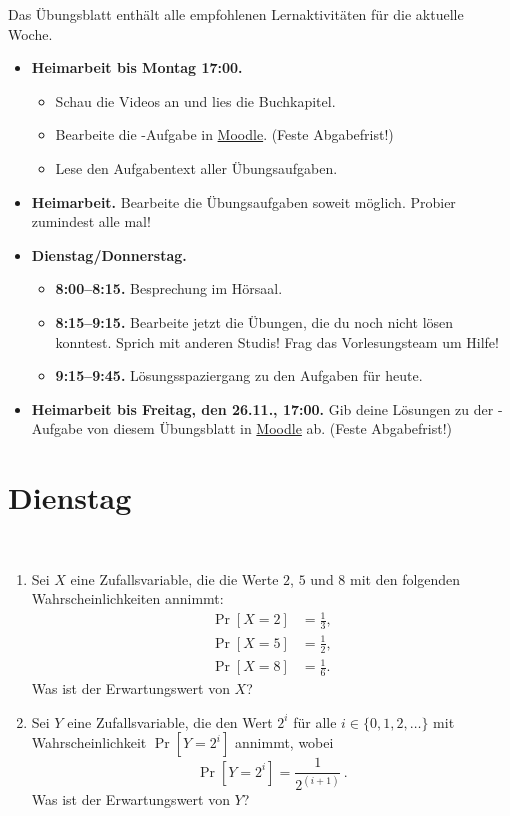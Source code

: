 \documentclass{uebung_cs}
\begin{document}
Das Übungsblatt enthält alle empfohlenen Lernaktivitäten für die aktuelle Woche.

\begin{itemize}
\item \textbf{Heimarbeit bis Montag 17:00.}
    \begin{itemize}
    \item 
    Schau die Videos an und lies die Buchkapitel.
    \item Bearbeite die -Aufgabe in \href{https://moodle.studiumdigitale.uni-frankfurt.de/moodle/course/view.php?id=2241}{Moodle}. (Feste Abgabefrist!)
    \item Lese den Aufgabentext aller Übungsaufgaben.
    \end{itemize}
\item \textbf{Heimarbeit.} Bearbeite die Übungsaufgaben soweit möglich. Probier zumindest alle mal!
\item \textbf{Dienstag/Donnerstag.}
\begin{itemize}
    \item \textbf{8:00--8:15.} Besprechung im Hörsaal.
    \item \textbf{8:15--9:15.} Bearbeite jetzt die Übungen, die du noch nicht lösen konntest. Sprich mit anderen Studis! Frag das Vorlesungsteam um Hilfe!
    \item \textbf{9:15--9:45.} Lösungsspaziergang zu den Aufgaben für heute.
\end{itemize}

\item \textbf{Heimarbeit bis Freitag, den 26.11., 17:00.} Gib deine Lösungen zu der -Aufgabe von diesem Übungsblatt in \href{https://moodle.studiumdigitale.uni-frankfurt.de/moodle/course/view.php?id=2241}{Moodle} ab. (Feste Abgabefrist!)
\end{itemize}

\section*{Dienstag}

\begin{aufgabe}[Erwartungswerte]\
	\begin{enumerate}
		\item Sei $X$ eine Zufallsvariable, die die Werte $2$, $5$ und $8$ mit den folgenden Wahrscheinlichkeiten annimmt:
		\begin{align*}
			\Pr[X=2] &= \tfrac{1}{3},\\
			\Pr[X=5] &= \tfrac{1}{2},\\
			\Pr[X=8] &= \tfrac{1}{6}.
		\end{align*}
		Was ist der Erwartungswert von $X$?\\
		
		\item Sei $Y$ eine Zufallsvariable, die den Wert $2^i$ für alle $i \in \{0,1,2,\dots\}$ mit Wahrscheinlichkeit $\Pr[Y=2^i]$ annimmt, wobei \[\Pr[Y=2^i]= \frac{1}{2^{(i+1)}}\,.\]
		Was ist der Erwartungswert von $Y$?
	\end{enumerate}	
\end{aufgabe}
\end{document}
